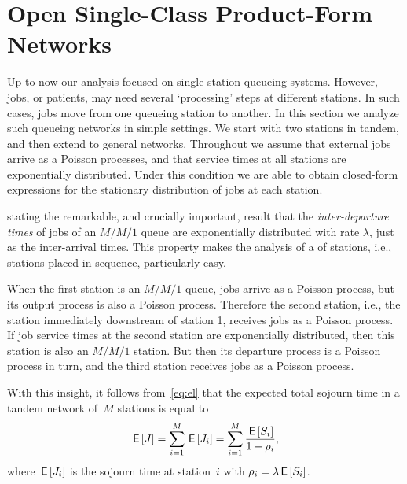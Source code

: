 \documentclass[queueing-book.tex]{subfiles}
\begin{document}
\section{Open Single-Class Product-Form Networks}
\label{sec:jackson-networks}


Up to now our analysis focused on single-station queueing systems.
However, jobs, or patients, may need several `processing' steps at different stations.
In such cases, jobs move from one queueing station to another.
In this section we analyze such queueing networks in simple settings.
We start with two stations in tandem, and then extend to general networks.
Throughout we assume that external jobs
arrive as a Poisson processes, and that service times at all stations are exponentially distributed.
Under this condition we are able to obtain closed-form expressions for the stationary distribution of jobs at each station.




 stating the remarkable, and crucially important, result that the \emph{inter-departure times} of jobs of an $M/M/1$ queue are exponentially distributed with rate $\lambda$, just as the inter-arrival times. This property makes the analysis of a  of stations, i.e., stations placed in sequence, particularly easy.

When the first station is an $M/M/1$ queue, jobs arrive as a Poisson process, but its output process is also a Poisson process.
Therefore the second station, i.e., the station immediately downstream of station 1, receives jobs as a Poisson process.
If job service times at the second station are exponentially distributed, then this station is also an $M/M/1$ station.
But then its departure process is a Poisson process in turn, and the third station receives jobs as a Poisson process.


With this insight, it follows from~\cref{eq:el} that the expected total sojourn time in a tandem network of~$M$ stations is equal to
\begin{equation*}
  \,\mathsf{E}\left[J\right] = \sum_{i=1}^{M}\,\mathsf{E}\left[J_i\right] = \sum_{i=1}^M \frac{\,\mathsf{E}\left[S_i\right]}{1-\rho_i},
\end{equation*}
where $\,\mathsf{E}\left[J_i\right]$ is the sojourn time at station~$i$ with $\rho_i = \lambda \,\mathsf{E}\left[S_i\right]$.
\end{document}
